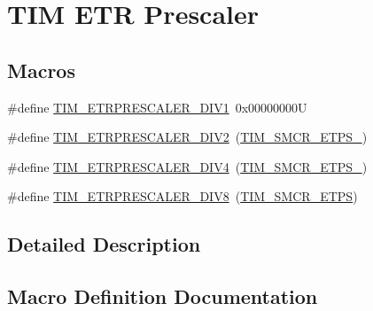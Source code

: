 \hypertarget{group___t_i_m___e_t_r___prescaler}{}\section{T\+IM E\+TR Prescaler}
\label{group___t_i_m___e_t_r___prescaler}
\subsection*{Macros}
\begin{DoxyCompactItemize}
\item 
\#define \mbox{\hyperlink{group___t_i_m___e_t_r___prescaler_gabead5364c62645592e42545ba09ab88a}{T\+I\+M\+\_\+\+E\+T\+R\+P\+R\+E\+S\+C\+A\+L\+E\+R\+\_\+\+D\+I\+V1}}~0x00000000U
\item 
\#define \mbox{\hyperlink{group___t_i_m___e_t_r___prescaler_gaf7fe49f67bdb6b33b9b41953fee75680}{T\+I\+M\+\_\+\+E\+T\+R\+P\+R\+E\+S\+C\+A\+L\+E\+R\+\_\+\+D\+I\+V2}}~(\mbox{\hyperlink{group___peripheral___registers___bits___definition_ga00b43cd09557a69ed10471ed76b228d8}{T\+I\+M\+\_\+\+S\+M\+C\+R\+\_\+\+E\+T\+P\+S\+\_}})
\item 
\#define \mbox{\hyperlink{group___t_i_m___e_t_r___prescaler_gaa09da30c3cd28f1fe6b6f3f599a5212c}{T\+I\+M\+\_\+\+E\+T\+R\+P\+R\+E\+S\+C\+A\+L\+E\+R\+\_\+\+D\+I\+V4}}~(\mbox{\hyperlink{group___peripheral___registers___bits___definition_gabf12f04862dbc92ca238d1518b27b16b}{T\+I\+M\+\_\+\+S\+M\+C\+R\+\_\+\+E\+T\+P\+S\+\_}})
\item 
\#define \mbox{\hyperlink{group___t_i_m___e_t_r___prescaler_ga834e38200874cced108379b17a24d0b7}{T\+I\+M\+\_\+\+E\+T\+R\+P\+R\+E\+S\+C\+A\+L\+E\+R\+\_\+\+D\+I\+V8}}~(\mbox{\hyperlink{group___peripheral___registers___bits___definition_ga0ebb9e631876435e276211d88e797386}{T\+I\+M\+\_\+\+S\+M\+C\+R\+\_\+\+E\+T\+PS}})
\end{DoxyCompactItemize}


\subsection{Detailed Description}


\subsection{Macro Definition Documentation}
\mbox{\label{group___t_i_m___e_t_r___prescaler_gabead5364c62645592e42545ba09ab88a}} 
